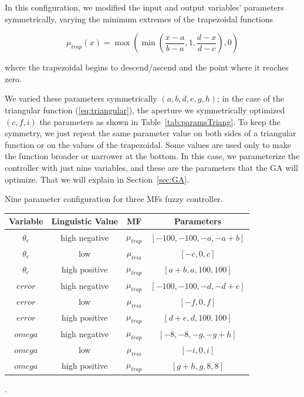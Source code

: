 \documentclass[symmetry,article,submit,moreauthors,pdftex]{Definitions/mdpi}
\begin{document}
In this configuration, we modified the input and output variables' parameters
symmetrically, varying the minimum extremes of the trapezoidal functions 

\begin{equation}\label{eq:trapezoidal}
\mu_{trap}(x) = \max{ \left( \min{ \left( \frac{x-a}{b-a},1,\frac{d-x}{d-c} \right)}, 0 \right)}  
\end{equation}

where the trapezoidal begins to descend/ascend and the point where it reaches zero.

We varied these parameters symmetrically $(a, b, d, e, g, h)$; in the case of
the triangular function (\ref{eq:triangular}), the aperture we symmetrically
optimized $(c, f, i)$ the parameters as shown in Table~\ref{tab:paramsTriang}.
To keep the symmetry, we just repeat the same parameter value on both sides of
a triangular function or on the values of the trapezoidal. Some values are used
only to make the function broader or narrower at the bottom. In this case, we
parameterize the controller with just nine variables, and these are the
parameters that the GA will optimize. That we will explain in
Section~\ref{sec:GA}.

\begin{specialtable}[htbp]
    \small
    \caption{Nine parameter configuration for three MFs fuzzy controller.}\label{tab:paramsTriang}
    \begin{tabular}{cccc}
    \toprule
    \textbf{Variable} & \textbf{Linguistic Value} & \textbf{MF}& \textbf{Parameters}  \\
    \midrule
    $\theta_e$ & high negative  & $\mu_{trap}$  & $[-100, -100, -a, -a+b]$     \\ 
    $\theta_e$ & low            & $\mu_{tria}$  & $[-c, 0, c]$     \\ 
    $\theta_e$ & high positive  & $\mu_{trap}$  & $[a+b, a, 100, 100]$     \\ 

    \midrule
    $error$ & high negative  & $\mu_{trap}$  & $[-100, -100, -d, -d+e]$     \\ 
    $error$ & low            & $\mu_{tria}$  & $[-f, 0, f]$     \\ 
    $error$ & high positive  & $\mu_{trap}$  & $[d+e, d, 100, 100]$     \\ 

    \midrule
    $omega$ & high negative  & $\mu_{trap}$  & $[-8, -8, -g, -g+h]$     \\ 
    $omega$ & low            & $\mu_{tria}$  & $[-i, 0, i]$     \\ 
    $omega$ & high positive  & $\mu_{trap}$  & $[g+h, g, 8, 8]$     \\ 
    \bottomrule
\end{tabular}
\end{specialtable}.
\end{document}
